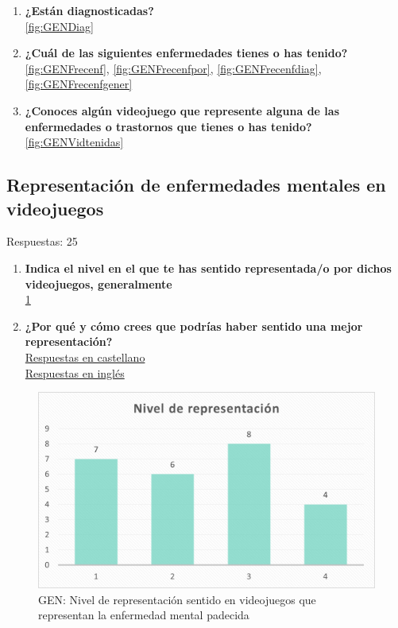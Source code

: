 \documentclass[12pt, a4paper,twoside,titlepage]{book}
\begin{document}
\begin{enumerate}[label=\textbf{\arabic*}.]
     \item \textbf{¿Están diagnosticadas? }\\
     \ref{fig:GENDiag}
     \item \textbf{¿Cuál de las siguientes enfermedades tienes o has tenido?}\\
     \ref{fig:GENFrecenf}, \ref{fig:GENFrecenfpor}, \ref{fig:GENFrecenfdiag}, \ref{fig:GENFrecenfgener}
     \item \textbf{¿Conoces algún videojuego que represente alguna de las enfermedades o trastornos que tienes o has tenido?}\\
     \ref{fig:GENVidtenidas}
\end{enumerate}




\subsection{Representación de enfermedades mentales en videojuegos}
Respuestas: 25
\begin{enumerate}[label=\textbf{\arabic*}.]
     \item \textbf{Indica el nivel en el que te has sentido representada/o por dichos videojuegos, generalmente}\\
     \ref{fig:GENNivel}
     \item \textbf{¿Por qué y cómo crees que podrías haber sentido una mejor representación?}\\
     \hyperref[representacionCastellano]{Respuestas en castellano}\\
     \hyperref[representacionIngles]{Respuestas en inglés}
\end{enumerate}

\begin{figure}
    \centering
    \includegraphics[width=.8\linewidth]{ANEXO Gen/29AnexGENnivel}
    \caption{GEN: Nivel de representación sentido en videojuegos que representan la enfermedad mental padecida}
    \label{fig:GENNivel}
\end{figure}
\end{document}
